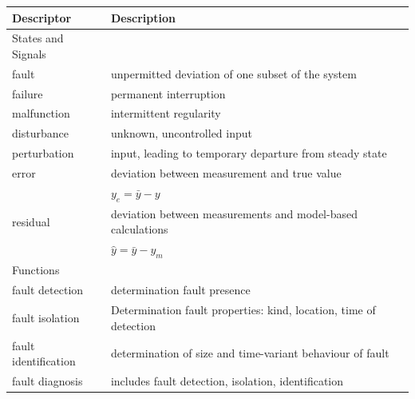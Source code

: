 \begin{table}[!h]
    \centering
    \begin{tabular}{@{}ll@{}}
        \toprule
        Descriptor            & Description                                                                               \\ \midrule
        States and Signals    &                                                                                           \\ \midrule
        fault                 & unpermitted deviation of one subset of the system                                         \\
        failure               & permanent interruption                                                                    \\
        malfunction           & intermittent regularity                                                                   \\
        disturbance           & unknown, uncontrolled input                                                               \\
        perturbation          & input, leading to temporary departure from steady state                                   \\
        error                 & deviation between measurement and true value                                              \\              & $y_e = \bar{y} -y$                               \\
        residual             & deviation between measurements and model-based calculations                                                                                           \\       & $\hat{y} = \bar{y} -y_m$                                                              \\ \bottomrule
        Functions       &                         \\ \midrule
        fault detection  & determination fault presence                                 \\
        fault isolation       & Determination fault properties: kind, location, time of detection                                       \\
        fault identification            & determination of size and time-variant behaviour of fault                               \\
        fault diagnosis           & includes fault detection, isolation, identification                         \\

\end{tabular}
\end{table}
